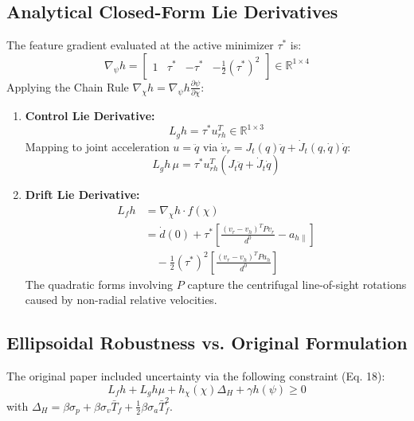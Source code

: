\documentclass[10pt,twocolumn,a4paper]{article}
\begin{document}
\subsection{Analytical Closed-Form Lie Derivatives}
The feature gradient evaluated at the active minimizer $\tau^*$ is:
\begin{equation}
\nabla_\psi h = \begin{bmatrix} 1 & \tau^* & -\tau^* & -\frac{1}{2}(\tau^*)^2 \end{bmatrix} \in \mathbb{R}^{1 \times 4}
\end{equation}
Applying the Chain Rule $\nabla_\chi h = \nabla_\psi h \frac{\partial \psi}{\partial \chi}$:
\begin{enumerate}
    \item \textbf{Control Lie Derivative:}
    \begin{equation}
    L_g h = \tau^* u_{rh}^T \in \mathbb{R}^{1 \times 3}
    \end{equation}
    Mapping to joint acceleration $u = \ddot{q}$ via $\dot{v}_r = J_t(q) \ddot{q} + \dot{J}_t(q, \dot{q})\dot{q}$:
    \begin{equation}
    L_g h \, \mu = \tau^* u_{rh}^T \left( J_t \ddot{q} + \dot{J}_t \dot{q} \right)
    \end{equation}
    \item \textbf{Drift Lie Derivative:}
    \begin{align}
    L_f h &= \nabla_\chi h \cdot f(\chi) \nonumber\\
    &= \dot{d}(0) + \tau^* \left[ \frac{(v_r - v_h)^T P v_r}{d^0} - a_{h\parallel} \right] \nonumber\\
    &\quad - \frac{1}{2}(\tau^*)^2 \left[ \frac{(v_r - v_h)^T P a_h}{d^0} \right]
    \end{align}
    The quadratic forms involving $P$ capture the centrifugal line-of-sight rotations caused by non-radial relative velocities.
\end{enumerate}

\subsection{Ellipsoidal Robustness vs. Original Formulation}
The original paper included uncertainty via the following constraint (Eq. 18):
\begin{equation}
L_f h + L_g h \mu + h_\chi(\chi) \Delta_H + \gamma h(\psi) \ge 0 \label{eq:paper_robust}
\end{equation}
with $\Delta_H = \beta \sigma_p + \beta \sigma_v \bar{T}_f + \frac{1}{2}\beta \sigma_a \bar{T}_f^2$.
\end{document}
